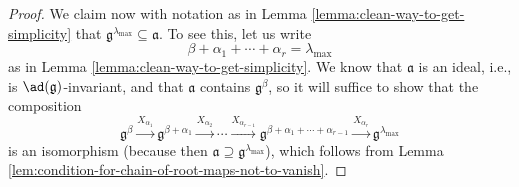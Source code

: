 \documentclass[reqno]{amsart} 
\begin{document}
\begin{proof}
  We claim now with notation as in Lemma \ref{lemma:clean-way-to-get-simplicity} that $\mathfrak{g}^{\lambda_{\max}} \subseteq \mathfrak{a}$.  To see this, let us write
  \begin{equation}\label{eq:from-beta-to-largest-root}
    \beta + \alpha_1 + \dotsb + \alpha_r
    = \lambda_{\max}
  \end{equation}
  as in Lemma \ref{lemma:clean-way-to-get-simplicity}.  We know that $\mathfrak{a}$ is an ideal, i.e., is $\ad(\mathfrak{g})$-invariant, and that $\mathfrak{a}$ contains $\mathfrak{g}^\beta$, so it will suffice to show that the composition
  \begin{equation}
    \mathfrak{g}^\beta \xrightarrow{X_{\alpha_1}}
    \mathfrak{g}^{\beta+\alpha_1}
    \xrightarrow{X_{\alpha_2}} \dotsb
    \xrightarrow{X_{\alpha_{r-1}}}
    \mathfrak{g}^{\beta+\alpha_1+\dotsb+\alpha_{r-1}}
    \xrightarrow{X_{\alpha_r}}
    \mathfrak{g}^{\lambda_{\max}}
  \end{equation}
  is an isomorphism (because then $\mathfrak{a} \supseteq \mathfrak{g}^{\lambda_{\max}}$), which follows from Lemma \ref{lem:condition-for-chain-of-root-maps-not-to-vanish}.




\end{proof}
\end{document}
